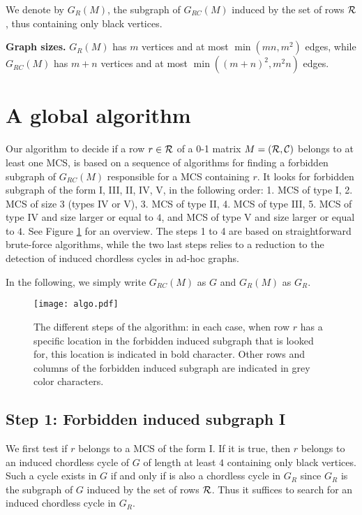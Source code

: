 \documentclass{article}
\begin{document}
We denote by $G_{R}(M)$, the subgraph of $G_{RC}(M)$ induced by the set of rows 
${\cal R}$, thus containing only black vertices.

\noindent
{\bf Graph sizes.} $G_{R}(M)$ has $m$ vertices and at most $\min(mn,m^2)$ 
edges, while $G_{RC}(M)$  has $m+n$ vertices and at most $\min((m+n)^2,m^2n)$ 
edges.

\section{A global algorithm}

Our algorithm to decide if a row $r\in {\cal R}$ of a 0-1 matrix 
$M=({\cal R},{\cal C})$
belongs to at least one MCS, is based on a sequence of algorithms for finding 
a forbidden subgraph of $G_{RC}(M)$ responsible for a MCS 
containing $r$. It looks for forbidden subgraph of the form I, III, II, IV, V, 
in the following order: 1. MCS of type I, 2. MCS of size $3$ (types IV or V),
3. MCS of type II, 4. MCS of type III, 5. MCS of type IV and size larger or 
equal to $4$, and MCS of type V and size larger or equal to $4$. See Figure  
\ref{Algo}  for an overview. The steps 1 to 4 are based on straightforward 
brute-force algorithms, while the two last steps relies to a reduction to the 
detection of induced chordless cycles in ad-hoc graphs.

In the following, we simply write 
$G_{RC}(M)$ as $G$ and $G_{R}(M)$ as $G_R$.

\begin{figure}[htb]
  \centering
\texttt{[image: algo.pdf]}
\caption{The different steps of the algorithm: in each case, when row $r$ has 
a specific location in the forbidden induced subgraph that is looked for, this 
location is indicated in bold character. Other rows and columns of the 
forbidden induced subgraph are indicated in grey color characters.}
 \label{Algo}
\end{figure}

\subsection{Step 1: Forbidden induced subgraph I}

We first test if $r$ belongs to a MCS  of the form I.
If it is true, then $r$ belongs to an induced chordless cycle of $G$
of length at least $4$ containing only black vertices. 
Such a cycle exists in $G$ if and only if is also a chordless
cycle in $G_{R}$ since $G_{R}$ is the subgraph of $G$ induced 
by the set of rows ${\cal R}$.
Thus it suffices to search for an induced chordless cycle 
in $G_{R}$.
\end{document}
